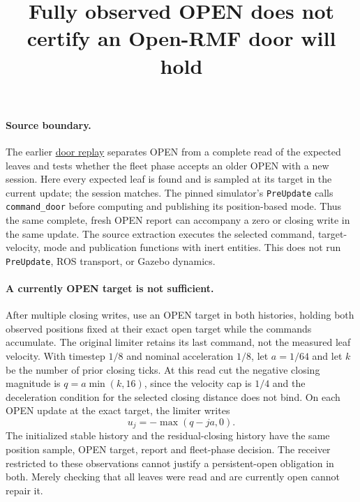 \documentclass{article}
\title{Fully observed OPEN does not certify an Open-RMF door will hold}
\author{}
\date{}
\begin{document}
\maketitle
\paragraph{Source boundary.}
The earlier \href{https://github.com/eternal-november/eos-research-programmes/pull/507}{door replay}
separates OPEN from a complete read of the expected leaves and tests
whether the fleet phase accepts an older OPEN with a new session.
Here every expected leaf is found and is sampled at its target in the
current update; the session matches. The pinned simulator's
\texttt{PreUpdate} calls \texttt{command\_door} before computing and
publishing its position-based mode. Thus the same complete, fresh
OPEN report can accompany a zero or closing write in the same update.
The source extraction executes the selected command, target-velocity,
mode and publication functions with inert entities. This does not run
\texttt{PreUpdate}, ROS transport, or Gazebo dynamics.

\paragraph{A currently OPEN target is not sufficient.}
After multiple closing writes, use an OPEN target in both histories,
holding both observed positions fixed at their exact open target
while the commands accumulate. The original limiter retains its last
command, not the measured leaf velocity. With timestep $1/8$ and
nominal acceleration $1/8$, let $a=1/64$ and let $k$ be the number of
prior closing ticks. At this read cut the negative closing magnitude is
$q=a\min(k,16)$, since the velocity cap is $1/4$ and the deceleration
condition for the selected closing distance does not bind. On each
OPEN update at the exact target, the limiter writes
\[
  u_{j}=-\max(q-ja,0).
\]
The initialized stable history and the residual-closing history have the
same position sample, OPEN target, report and fleet-phase decision.
The receiver restricted to these observations cannot justify a
persistent-open obligation in both. Merely checking that all leaves
were read and are currently open cannot repair it.
\end{document}
